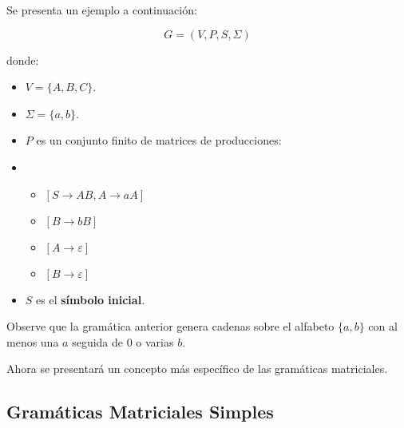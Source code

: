 \documentclass[12pt]{article}
\begin{document}
Se presenta un ejemplo a continuación:

\[
    G = (V, P, S,\Sigma)
\]

donde:
\begin{itemize}
    \item \( V = \{A,B,C\} \).
    \item \( \Sigma=\{a,b\} \).
    \item \( P \) es un conjunto finito de matrices de producciones:
    \item \begin{itemize}
              \item \([S\to AB,A\to aA]\)
              \item \([B\to bB]\)
              \item \([A\to \varepsilon]\)
              \item \([B\to \varepsilon]\)
          \end{itemize}
    \item \( S  \) es el \textbf{símbolo inicial}.
\end{itemize}

Observe que la gramática anterior genera cadenas sobre el alfabeto $\{a,b\}$ con al menos una $a$ seguida 
de 0 o varias $b$.

Ahora se presentará un concepto más específico de las gramáticas matriciales.

\subsection{Gramáticas Matriciales Simples}
\end{document}
